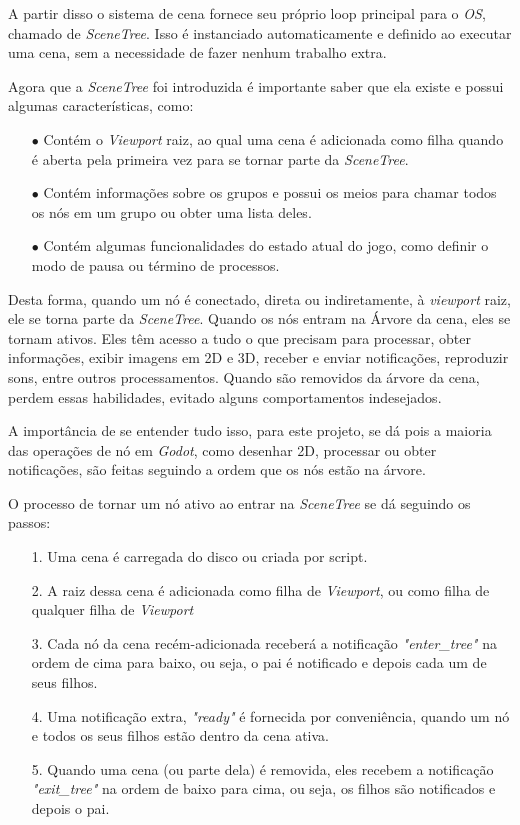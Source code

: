 A partir disso o sistema de cena fornece seu próprio loop principal para o 
\textit{OS}, chamado de \textit{SceneTree}. 
Isso é instanciado automaticamente e definido ao executar uma cena, sem a 
necessidade de fazer nenhum trabalho extra.

Agora que a \textit{SceneTree} foi introduzida é importante saber que ela existe
e possui algumas características, como:

\begin{itemize}
    \item[$\bullet$]
        Contém o \textit{Viewport} raiz, ao qual uma cena é adicionada 
        como filha quando é aberta pela primeira vez para se tornar parte da
        \textit{SceneTree}.
    \item[$\bullet$]
        Contém informações sobre os grupos e possui os meios para chamar 
        todos os nós em um grupo ou obter uma lista deles.
    \item[$\bullet$]
        Contém algumas funcionalidades do estado atual do
        jogo, como definir o modo de pausa ou término de processos.
\end{itemize}

Desta forma, quando um nó é conectado, direta ou indiretamente, à 
\textit{viewport} raiz, ele se torna parte da \textit{SceneTree}. Quando os nós 
entram na Árvore da cena, eles se tornam ativos. Eles têm acesso a tudo o que 
precisam para processar, obter informações, exibir imagens em 2D e 3D, receber 
e enviar notificações, reproduzir sons, entre outros processamentos. Quando são
removidos da árvore da cena, perdem essas habilidades, evitado alguns 
comportamentos indesejados.

A importância de se entender tudo isso, para este projeto, se dá pois a maioria
das operações de nó em \textit{Godot}, como desenhar 2D, processar ou obter 
notificações, são feitas seguindo a ordem que os nós estão na árvore.

O processo de tornar um nó ativo ao entrar na \textit{SceneTree} se dá seguindo
os passos:
\begin{itemize}
    \item[1.]
        Uma cena é carregada do disco ou criada por script.
    \item[2.]
        A raiz dessa cena é adicionada como filha de \textit{Viewport}, ou como 
        filha de qualquer filha de \textit{Viewport}
    \item[3.]
        Cada nó da cena recém-adicionada receberá a notificação 
        \textit{"enter\_tree"} na ordem de cima para baixo, ou seja, o pai é
        notificado e depois cada um de seus filhos.
    \item[4.]
        Uma notificação extra, \textit{"ready"} é fornecida por conveniência, 
        quando um nó e todos os seus filhos estão dentro da cena ativa.
    \item[5.]
        Quando uma cena (ou parte dela) é removida, eles recebem a notificação
        \textit{"exit\_tree"} na ordem de baixo para cima, ou seja, os filhos são
        notificados e depois o pai.
\end{itemize}

